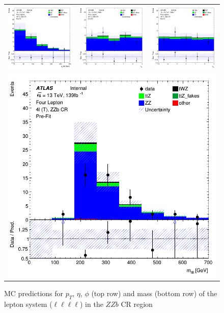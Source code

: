 \begin{figure}[htbp]
\centering
  \begin{tabular}{ccc}

    \includegraphics[width=.2\textwidth]{figures/PreFitPlots/lep4_ZZb_4T_llll_sys_pt}&
    \includegraphics[width=.2\textwidth]{figures/PreFitPlots/lep4_ZZb_4T_llll_sys_eta} &
    \includegraphics[width=.2\textwidth]{figures/PreFitPlots/lep4_ZZb_4T_llll_sys_phi} \\
    \multicolumn{3}{c}{\includegraphics[width=.2\textwidth]{figures/PreFitPlots/lep4_ZZb_4T_llll_sys_mass}}

  \end{tabular}
  \caption{MC predictions for $p_{T}$, $\eta$, $\phi$ (top row) and mass (bottom row) of the lepton system ($\ell \ell \ell \ell$) in the $ZZb$ CR region }
  \label{fig:4lep-ZZb-CR-Lep-sys-Plots}
\end{figure}
\clearpage

